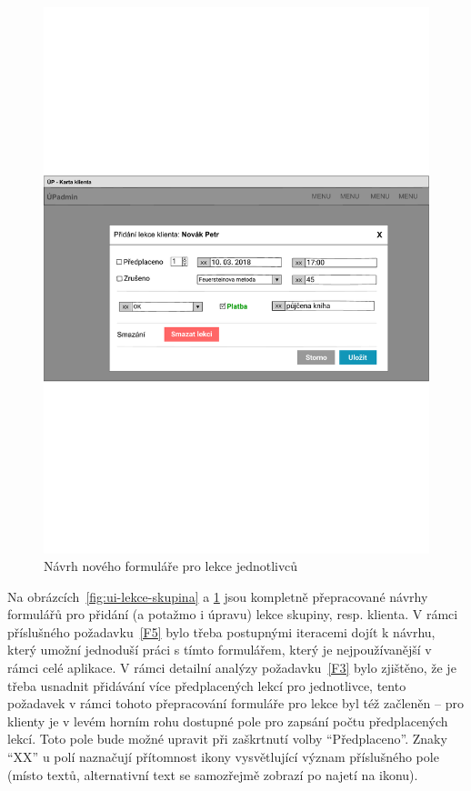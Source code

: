 \begin{figure}\centering
    \includegraphics[width=1\textwidth]{img/ui-lekce-klient}
    \caption{Návrh nového formuláře pro lekce jednotlivců}\label{fig:ui-lekce-klient}
\end{figure}

Na obrázcích~\ref{fig:ui-lekce-skupina} a \ref{fig:ui-lekce-klient} jsou kompletně přepracované návrhy formulářů pro přidání (a potažmo i úpravu) lekce skupiny, resp. klienta. V rámci příslušného požadavku~\ref{F5} bylo třeba postupnými iteracemi dojít k návrhu, který umožní jednoduší práci s tímto formulářem, který je nejpoužívanější v rámci celé aplikace. V rámci detailní analýzy požadavku~\ref{F3} bylo zjištěno, že je třeba usnadnit přidávání více předplacených lekcí pro jednotlivce, tento požadavek v rámci tohoto přepracování formuláře pro lekce byl též začleněn -- pro klienty je v levém horním rohu dostupné pole pro zapsání počtu předplacených lekcí. Toto pole bude možné upravit při zaškrtnutí volby \enquote{Předplaceno}. Znaky \enquote{XX} u polí naznačují přítomnost ikony vysvětlující význam příslušného pole (místo textů, alternativní text se samozřejmě zobrazí po najetí na ikonu).

